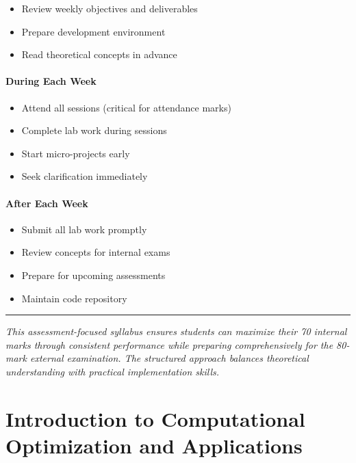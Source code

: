 \documentclass[
  letterpaper,
  DIV=11,
  numbers=noendperiod]{scrreprt}
\providecommand{\tightlist}{%
  \setlength{\itemsep}{0pt}\setlength{\parskip}{0pt}}
\begin{document}
\begin{itemize}
\tightlist
\item
  Review weekly objectives and deliverables
\item
  Prepare development environment
\item
  Read theoretical concepts in advance
\end{itemize}

\subsubsection*{During Each Week}\label{during-each-week}

\begin{itemize}
\tightlist
\item
  Attend all sessions (critical for attendance marks)
\item
  Complete lab work during sessions
\item
  Start micro-projects early
\item
  Seek clarification immediately
\end{itemize}

\subsubsection*{After Each Week}\label{after-each-week}

\begin{itemize}
\tightlist
\item
  Submit all lab work promptly
\item
  Review concepts for internal exams
\item
  Prepare for upcoming assessments
\item
  Maintain code repository
\end{itemize}

\begin{center}\rule{0.5\linewidth}{0.5pt}\end{center}

\emph{This assessment-focused syllabus ensures students can maximize
their 70 internal marks through consistent performance while preparing
comprehensively for the 80-mark external examination. The structured
approach balances theoretical understanding with practical
implementation skills.}


\chapter{Introduction to Computational Optimization and
Applications}\label{introduction-to-computational-optimization-and-applications}
\end{document}
